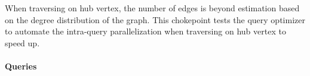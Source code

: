 
When traversing on hub vertex, the number of edges is beyond estimation based on
the degree distribution of the graph. This chokepoint tests the query optimizer
to automate the intra-query parallelization when traversing on hub vertex to
speed up.


\paragraph{Queries}
{\raggedright
}